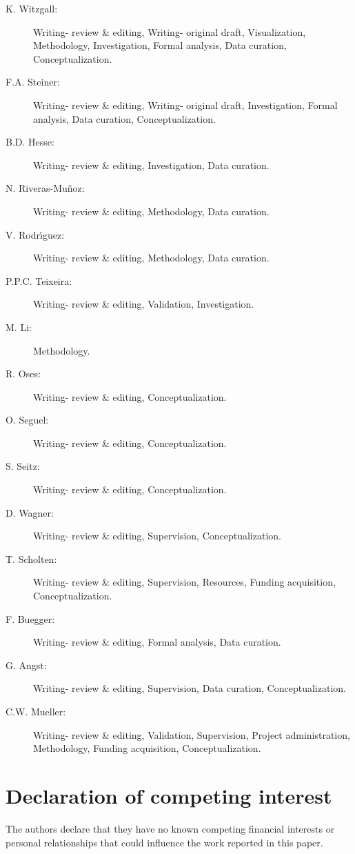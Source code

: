 \begin{description}
    \item[K. Witzgall:] Writing- review \& editing, Writing- original draft, Visualization, Methodology, Investigation, Formal analysis, Data curation, Conceptualization.
    \item[F.A. Steiner:] Writing- review \& editing, Writing- original draft, Investigation, Formal analysis, Data curation, Conceptualization.
    \item[B.D. Hesse:] Writing- review \& editing, Investigation, Data curation.
    \item[N. Riveras-Mu{\~n}oz:] Writing- review \& editing, Methodology, Data curation.
    \item[V. Rodr{\'\i}guez:] Writing- review \& editing, Methodology, Data curation. %
    \item[P.P.C. Teixeira:] Writing- review \& editing, Validation, Investigation.
    \item[M. Li:] Methodology.
    \item[R. Oses:] Writing- review \& editing, Conceptualization.
    \item[O. Seguel:] Writing- review \& editing, Conceptualization.
    \item[S. Seitz:] Writing- review \& editing, Conceptualization.
    \item[D. Wagner:] Writing- review \& editing, Supervision, Conceptualization.
    \item[T. Scholten:] Writing- review \& editing, Supervision, Resources, Funding acquisition, Conceptualization.
    \item[F. Buegger:] Writing- review \& editing, Formal analysis, Data curation.
    \item[G. Angst:] Writing- review \& editing, Supervision, Data curation, Conceptualization.
    \item[C.W. Mueller:] Writing- review \& editing, Validation, Supervision, Project administration, Methodology, Funding acquisition, Conceptualization.
\end{description}

\section*{Declaration of competing interest}

The authors declare that they have no known competing financial interests or personal relationships that could influence the work reported in this paper.

